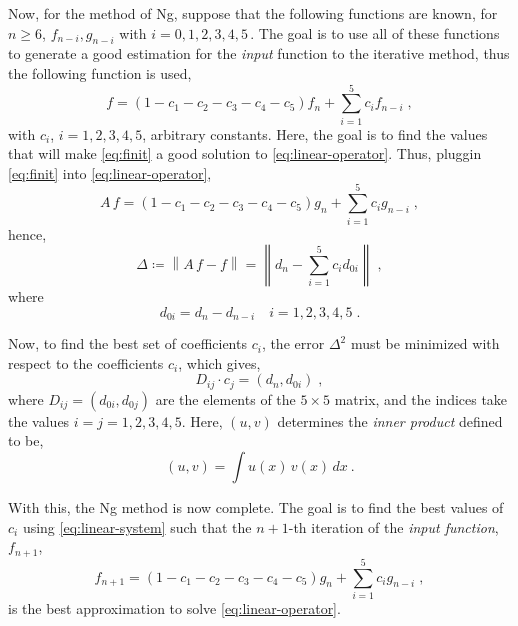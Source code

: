 Now, for the method of Ng, suppose that the following functions are known, for \(n \geq 6\),
\(f_{n-i}, g_{n-i}\) with \(i = 0,1,2,3,4,5 \, .\) The goal is to use all of these 
functions to generate a good estimation for the \emph{input} function to the iterative 
method, thus the following function is used,
\begin{equation}
    f=(1-c_{1}-c_{2}-c_{3}-c_{4}-c_{5}) f_n + \sum_{i=1}^{5} c_i f_{n-i}
    \; ,
    \label{eq:finit}
\end{equation}
with \(c_i\), \(i = 1,2,3,4,5\), arbitrary constants. Here, the goal is to find the values 
that will make \autoref{eq:finit} a good solution to \autoref{eq:linear-operator}.
Thus, pluggin \autoref{eq:finit} into \autoref{eq:linear-operator},
\begin{equation}
    A \, f = (1-c_{1}-c_{2}-c_{3}-c_{4}-c_{5}) g_n + \sum_{i=1}^{5} c_i g_{n-i}
    \; ,
    \label{eq:ginit}
\end{equation}
hence,
\begin{equation}
    \Delta \coloneqq \left\lVert A \, f - f \right\rVert =
    \left\lVert d_n - \sum_{i=1}^{5} c_i d_{0i} \right\rVert
    \; ,
    \label{eq:deltas}
\end{equation}
where
\begin{equation}
    d_{0i} = d_n - d_{n-i} \quad i=1,2,3,4,5
    \; .
    \label{eq:dzeros}
\end{equation}

Now, to find the best set of coefficients \(c_i\), the error \(\Delta^2\) must be minimized 
with respect to the coefficients \(c_i\), which gives,
\begin{equation}
    D_{ij} \cdot c_j = \left(d_n, d_{0i}\right)
    \; ,
    \label{eq:linear-system}
\end{equation}
where \(D_{ij} = \left(d_{0i}, d_{0j}\right)\) are the elements of the \(5 \times 5\) 
matrix, and the indices take the values \(i=j=1,2,3,4,5\). Here, \(\left(u, v\right)\) 
determines the \emph{inner product} defined to be,
\begin{equation}
    \left(u, v\right) = \int u(x) \, v(x) \, dx
    \: .
    \label{eq:inner-product}
\end{equation}

With this, the Ng method is now complete. The goal is to find the best values of \(c_i\) 
using \autoref{eq:linear-system} such that the \(n+1\)-th iteration of the \emph{input 
function}, \(f_{n+1}\),
\begin{equation}
    f_{n+1} = (1-c_{1}-c_{2}-c_{3}-c_{4}-c_{5}) g_n + \sum_{i=1}^{5} c_i g_{n-i}
    \; ,
    \label{eq:best-input}
\end{equation}
is the best approximation to solve \autoref{eq:linear-operator}.

